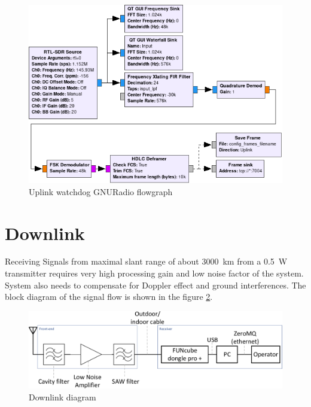 \begin{figure}
    \centering
    \includegraphics[width=0.8\paperwidth]{img/7/uplink_watchdog_flowgraph.png}
    \caption{Uplink watchdog GNURadio flowgraph}
    \label{uplink_watchdog_flowgraph}
\end{figure}



\section{Downlink}
Receiving Signals from maximal slant range of about \SI{3000}{\kilo\meter} from a \SI{0.5}{\watt} transmitter requires very high processing gain and low noise factor of the system. System also needs to compensate for Doppler effect and ground interferences. The block diagram of the signal flow is shown in the figure \ref{downlink_diagram}.

\begin{figure}
    \centering
    \includegraphics[width=0.8\paperwidth]{img/7/downlink_diagram.pdf}
    \caption{Downlink diagram}
    \label{downlink_diagram}
\end{figure}

